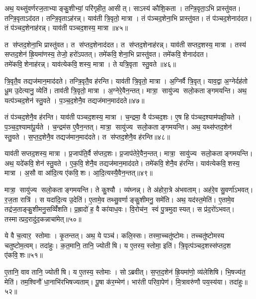 अथ॒ यथ्सु॑वर्णरज॒ताभ्याङ्कु॒शीभ्यां॒ परि॑गृहीत॒ आसीत्। साऽस्य॑ कौशि॒कता। तन्त्रि॒वृता॒ऽभि प्रास्तु॑वत। तन्त्रि॒वृताऽद॑दत। तन्त्रि॒वृताऽह॑रन्न्। याव॑ती त्रि॒वृतो॒ मात्रा। तं प॑ञ्चद॒शेना॒भि प्रास्तु॑वत। तं प॑ञ्चद॒शेनाद॑दत। तं प॑ञ्चद॒शेनाह॑रन्न्। याव॑ती पञ्चद॒शस्य॒ मात्रा॥४५॥

त स॑प्तद॒शेना॒भि प्रास्तु॑वत। त स॑प्तद॒शेनाद॑दत। त स॑प्तद॒शेनाह॑रन्न्। याव॑ती सप्तद॒शस्य॒ मात्रा। तस्य॑ सप्तद॒शेन॑ ह्रि॒यमा॑णस्य॒ तेजो॒ हरो॑ऽपतत्। तमे॑कवि॒शेना॒भि प्रास्तु॑वत। तमे॑कवि॒शेनाद॑दत। तमे॑कवि॒शेनाह॑रन्न्। याव॑त्येकवि॒शस्य॒ मात्रा। ते यत्रि॒वृता स्तु॒वते॥४६॥

त्रि॒वृतै॒व तद्यज॑मान॒माद॑दते। तन्त्रि॒वृतै॒व ह॑रन्ति। याव॑ती त्रि॒वृतो॒ मात्रा। अ॒ग्निर्वै त्रि॒वृत्। याव॒द्वा अ॒ग्नेर्दह॑तो धू॒म उ॒देत्यानु॒ व्येति॑। ताव॑ती त्रि॒वृतो॒ मात्रा। अ॒ग्नेरे॒वैन॒न्तत्। मात्रा॒ सायु॑ज्य सलो॒कताङ्गमयन्ति। अथ॒ यत्प॑ञ्चद॒शेन॑ स्तु॒वते। प॒ञ्च॒द॒शेनै॒व तद्यज॑मान॒माद॑दते॥४७॥

तं प॑ञ्चद॒शेनै॒व ह॑रन्ति। याव॑ती पञ्चद॒शस्य॒ मात्रा। च॒न्द्रमा॒ वै प॑ञ्चद॒शः। ए॒ष हि प॑ञ्चद॒श्याम॑पक्षी॒यते। प॒ञ्च॒द॒श्यामा॑पू॒र्यते। च॒न्द्रम॑स ए॒वैन॒न्तत्। मात्रा॒ सायु॑ज्य सलो॒कताङ्गमयन्ति। अथ॒ यथ्स॑प्तद॒शेन॑ स्तु॒वते। स॒प्त॒द॒शेनै॒व तद्यज॑मान॒माद॑दते। त स॑प्तद॒शेनै॒व ह॑रन्ति॥४८॥

याव॑ती सप्तद॒शस्य॒ मात्रा। प्र॒जाप॑ति॒र्वै स॑प्तद॒शः। प्र॒जाप॑तेरे॒वैन॒न्तत्। मात्रा॒ सायु॑ज्य सलो॒कताङ्गमयन्ति। अथ॒ यदे॑कवि॒शेन॑ स्तु॒वते। ए॒क॒वि॒शेनै॒व तद्यज॑मान॒माद॑दते। तमे॑कवि॒शेनै॒व ह॑रन्ति। याव॑त्येकवि॒शस्य॒ मात्रा। अ॒सौ वा आ॑दि॒त्य ए॑कवि॒शः। आ॒दि॒त्यस्यै॒वैन॒न्तत्॥४९॥

मात्रा॒ सायु॑ज्य सलो॒कताङ्गमयन्ति। ते कु॒श्यौ। व्य॑घ्नन्न्। ते अ॑होरा॒त्रे अ॑भवताम्। अह॑रे॒व सु॒वर्णा॑ऽभवत्। र॒ज॒ता रात्रि॑। स यदा॑दि॒त्य उ॒देति॑। ए॒तामे॒व तथ्सु॒वर्णाङ्कु॒शीमनु॒ समे॑ति। अथ॒ यद॑स्त॒मेति॑। ए॒तामे॒व तद्र॑ज॒ताङ्कु॒शीमनु॒सव्विँ॑शति। प्र॒ह्रादो॑ ह॒ वै का॑याध॒वः। वि॒रोच॑न॒ स्वं पु॒त्रमुदास्यत्। स प्र॑द॒रो॑ऽभवत्। तस्मात्प्रद॒रादु॑द॒कन्नाचा॑मेत्॥५०॥\anuvakamend[आ॒दि॒त्यः प॑ञ्चद॒शस्य॒ मात्रा स्तु॒वते॑ पञ्चद॒शेनै॒व तद्यज॑मान॒माद॑दते सप्तद॒शेनै॒व ह॑रन्त्यादि॒त्यस्यै॒वैनं॒ तद्वि॑शति च॒त्वारि॑ च]

ये वै च॒त्वार॒ स्तोमाः। कृ॒तन्तत्। अथ॒ ये पञ्च॑। कलि॒स्सः। तस्मा॒च्चतु॑ष्टोमः। तच्चतु॑ष्टोमस्य चतुष्टोम॒त्वम्। तदा॑हुः। क॒त॒मानि॒ तानि॒ ज्योतीषि। य ए॒तस्य॒ स्तोमा॒ इति॑। त्रि॒वृत्प॑ञ्चद॒शस्स॑प्तद॒श ए॑कवि॒शः॥५१॥

ए॒तानि॒ वाव तानि॒ ज्योतीषि। य ए॒तस्य॒ स्तोमाः। सोऽब्रवीत्। स॒प्त॒द॒शेन॑ ह्रि॒यमा॑णो॒ व्य॑लेशिषि। भि॒षज्य॑त॒ मेति॑। तम॒श्विनौ॑ धा॒नाभि॑रभिषज्यताम्। पू॒षा क॑र॒म्भेण॑। भार॑ती परिवा॒पेण॑। मि॒त्रावरु॑णौ पय॒स्य॑या। तदा॑हुः॥५२॥

